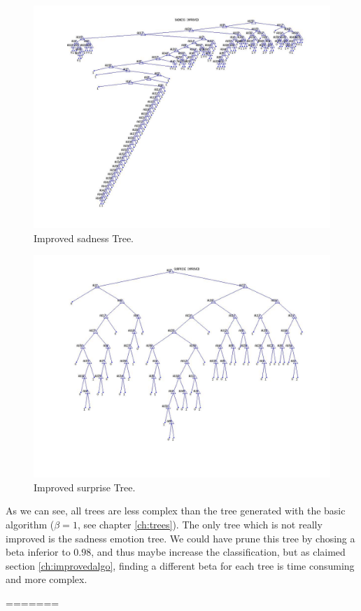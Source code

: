 \documentclass[a4paper,12pt,oneside,final]{report}
\newenvironment{changemargin}[2]{\begin{list}{}{%
\setlength{\topsep}{0pt}%
\setlength{\leftmargin}{0pt}%
\setlength{\rightmargin}{0pt}%
\setlength{\listparindent}{\parindent}%
\setlength{\itemindent}{\parindent}%
\setlength{\parsep}{0pt plus 1pt}%
\addtolength{\leftmargin}{#1}%
\addtolength{\rightmargin}{#2}%
}\item }{\end{list}}
\begin{document}
\begin{appendices}
\begin{figure}[!h]
\begin{changemargin}{-25mm}{-25mm}
\center
\includegraphics[scale=0.5]{sadness_improved.jpg}
\caption{Improved sadness Tree.}
\end{changemargin}
\end{figure}

\begin{figure}[!h]
\begin{changemargin}{-25mm}{-25mm}
\center
\includegraphics[scale=0.5]{surprise_improved.jpg}
\caption{Improved surprise Tree.}
\end{changemargin}
\end{figure}
\FloatBarrier
As we can see, all trees are less complex than the tree generated with the basic algorithm ($\beta = 1$, see chapter \ref{ch:trees}). The only tree which is not really improved is the sadness emotion tree. We could have prune this tree by chosing a beta inferior to $0.98$, and thus maybe increase the classification, but as claimed section \ref{ch:improvedalgo}, finding a different beta for each tree is time consuming and more complex.
\end{appendices}
=======
\end{document}
